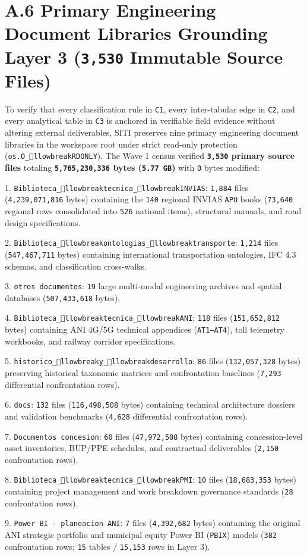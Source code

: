 \documentclass[10pt,a4paper]{article}
\begin{document}
\section*{A.6 Primary Engineering Document Libraries Grounding Layer 3 (\texttt{3,530} Immutable Source Files)}

To verify that every classification rule in \texttt{C1}, every inter-tabular edge in \texttt{C2}, and every analytical table in \texttt{C3} is anchored in verifiable field evidence without altering external deliverables, SITI preserves nine primary engineering document libraries in the workspace root under strict read-only protection (\texttt{os.O\_llowbreak{}RDONLY}). The Wave 1 census verified \textbf{\texttt{3,530} primary source files} totaling \textbf{\texttt{5,765,230,336} bytes (\texttt{5.77 GB})} with \texttt{0} bytes modified:

1. \texttt{Biblioteca\_llowbreak{}tecnica\_llowbreak{}INVIAS}: \texttt{1,884} files (\texttt{4,239,071,816} bytes) containing the \texttt{140} regional INVIAS \texttt{APU} books (\texttt{73,640} regional rows consolidated into \texttt{526} national items), structural manuals, and road design specifications.\par
2. \texttt{Biblioteca\_llowbreak{}ontologias\_llowbreak{}transporte}: \texttt{1,214} files (\texttt{547,467,711} bytes) containing international transportation ontologies, IFC 4.3 schemas, and classification cross-walks.\par
3. \texttt{otros documentos}: \texttt{19} large multi-modal engineering archives and spatial databases (\texttt{507,433,618} bytes).\par
4. \texttt{Biblioteca\_llowbreak{}tecnica\_llowbreak{}ANI}: \texttt{118} files (\texttt{151,652,812} bytes) containing ANI 4G/5G technical appendices (\texttt{AT1--AT4}), toll telemetry workbooks, and railway corridor specifications.\par
5. \texttt{historico\_llowbreak{}y\_llowbreak{}desarrollo}: \texttt{86} files (\texttt{132,057,328} bytes) preserving historical taxonomic matrices and confrontation baselines (\texttt{7,293} differential confrontation rows).\par
6. \texttt{docs}: \texttt{132} files (\texttt{116,498,508} bytes) containing technical architecture dossiers and validation benchmarks (\texttt{4,628} differential confrontation rows).\par
7. \texttt{Documentos concesion}: \texttt{60} files (\texttt{47,972,508} bytes) containing concession-level asset inventories, BUP/PPE schedules, and contractual deliverables (\texttt{2,150} confrontation rows).\par
8. \texttt{Biblioteca\_llowbreak{}tecnica\_llowbreak{}PMI}: \texttt{10} files (\texttt{18,683,353} bytes) containing project management and work breakdown governance standards (\texttt{28} confrontation rows).\par
9. \texttt{Power BI - planeacion ANI}: \texttt{7} files (\texttt{4,392,682} bytes) containing the original ANI strategic portfolio and municipal equity Power BI (\texttt{PBIX}) models (\texttt{382} confrontation rows; \texttt{15} tables / \texttt{15,153} rows in Layer 3).\par
\end{document}
